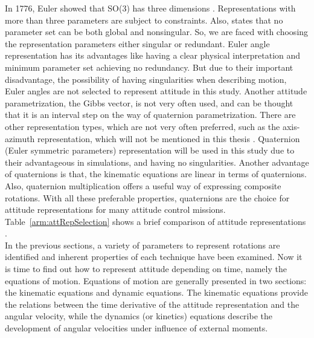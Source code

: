 In 1776, Euler showed that SO(3) has three dimensions \cite{stuelpnagel1964parametrization}. 
Representations with more than three parameters are subject to constraints. 
Also, \cite{stuelpnagel1964parametrization} states that no parameter set 
can be both global and nonsingular. 
So, we are faced with choosing the representation parameters either singular or redundant. 
Euler angle representation has its advantages like having a clear physical interpretation and minimum parameter set achieving no redundancy. 
But due to their important disadvantage, the possibility of having singularities when describing motion, Euler angles are not selected to represent attitude in this study.
Another attitude parametrization, the Gibbs vector, is not very often used, and can be thought that it is an interval step on the way of quaternion parametrization. 
There are other representation types, which are not very often preferred, such as the axis-azimuth representation, which will not be mentioned in this thesis \cite{bak1999spacecraft}. 
Quaternion (Euler symmetric parameters) representation will be used in this study due to their advantageous in simulations, and having no singularities.
Another advantage of quaternions is that, the kinematic equations are linear in terms of quaternions. 
Also, quaternion multiplication offers a useful way of expressing composite rotations. 
With all these preferable properties, quaternions are the choice for attitude representations for many attitude control missions. Table~\ref{arm:attRepSelection} shows a brief comparison of attitude representations \cite{bak1999spacecraft}.\\
In the previous sections, a variety of parameters to represent rotations are identified and inherent properties of each technique have been examined. 
Now it is time to find out how to represent attitude depending on time, namely the equations of motion. 
Equations of motion are generally presented in two sections: the kinematic equations and dynamic equations. 
The kinematic equations provide the relations between the time derivative of the attitude representation and the angular velocity, while the dynamics (or kinetics) equations describe the development of angular velocities under influence of external moments.

